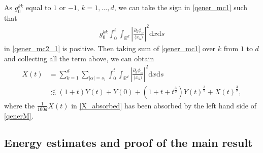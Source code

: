 \documentclass[10pt,twoside,a4paper]{article}
\numberwithin{equation}{section}\allowdisplaybreaks
\def\leq{\leqslant}
\begin{document}
As  $  g^{kk}_0  $ equal to $ 1 $ or $ -1 $, $ k=1,\dots ,d $,  we can take the sign in \eqref{qener_mc1} such that
\begin{align*}
 g^{kk}_0\int_0^t     \int_{\mathbb{R}^{d}} \left|\frac{\partial_k \phi_{\alpha }  } {\langle x_k\rangle}\right|^2  \mathrm{d} x \mathrm{d} s
\end{align*}
in \eqref{qener_mc2_1} is positive. Then 
taking sum of \eqref{qener_mc1} over $ k $ from $ 1 $ to $ d $ and collecting  all the term above, we can obtain
\begin{align}   \label{qenerM}
	X(t) &=\sum_{k=1}^d \sum_{|\alpha|= s_1}  \int_0^t     \int_{\mathbb{R}^{d}} \left|\frac{\partial_k \phi_{\alpha }  } {\langle x_k\rangle}\right|^2  \mathrm{d} x \mathrm{d} s \\
&\lesssim (1+t)Y(t)+Y(0) + (1+t+t^{\frac 32}) Y(t)^{\frac 32} + X(t)^{\frac 32}, \nonumber
\end{align}
where  the $ \frac 1{100d} X(t) $ in \eqref{X_absorbed}  has been absorbed by the left hand side of \eqref{qenerM}.



\subsection{Energy  estimates and  proof of the main result} \label{s3.2}
\end{document}
